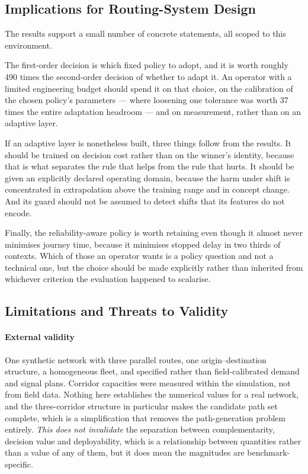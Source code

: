 \documentclass[preprint,12pt]{elsarticle}
\begin{document}
\subsection{Implications for Routing-System Design}
\label{sec:disc:design}

The results support a small number of concrete statements, all scoped to this
environment.

The first-order decision is which fixed policy to adopt, and it is worth roughly
490 times the second-order decision of whether to adapt it. An operator with a
limited engineering budget should spend it on that choice, on the calibration of
the chosen policy's parameters --- where loosening one tolerance was worth 37
times the entire adaptation headroom --- and on measurement, rather than on an
adaptive layer.

If an adaptive layer is nonetheless built, three things follow from the results.
It should be trained on decision cost rather than on the winner's identity,
because that is what separates the rule that helps from the rule that hurts. It
should be given an explicitly declared operating domain, because the harm under
shift is concentrated in extrapolation above the training range and in concept
change. And its guard should not be assumed to detect shifts that its features do
not encode.

Finally, the reliability-aware policy is worth retaining even though it almost
never minimises journey time, because it minimises stopped delay in two thirds of
contexts. Which of those an operator wants is a policy question and not a
technical one, but the choice should be made explicitly rather than inherited from
whichever criterion the evaluation happened to scalarise.

\subsection{Limitations and Threats to Validity}
\label{sec:limits}

\paragraph{External validity} One synthetic network with three parallel routes,
one origin--destination structure, a homogeneous fleet, and specified rather than
field-calibrated demand and signal plans. Corridor capacities were measured within
the simulation, not from field data. Nothing here establishes the numerical values
for a real network, and the three-corridor structure in particular makes the
candidate path set complete, which is a simplification that removes the
path-generation problem entirely. \emph{This does not invalidate} the separation
between complementarity, decision value and deployability, which is a relationship
between quantities rather than a value of any of them, but it does mean the
magnitudes are benchmark-specific.
\end{document}
